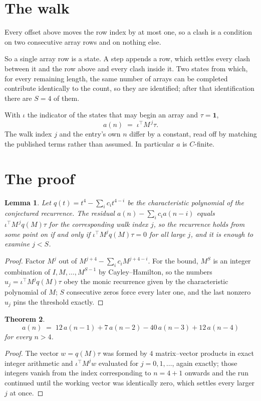 \documentclass[11pt,a4paper]{article}
\theoremstyle{plain}
\newtheorem{theorem}{Theorem}
\newtheorem{lemma}[theorem]{Lemma}
\theoremstyle{definition}
\begin{document}
\section{The walk}

Every offset above moves the row index by at most one, so a clash is a condition on two
consecutive array rows and on nothing else.

So a single array row is a state. A step appends a row, which settles every clash between it
and the row above and every clash inside it. Two states from which, for every remaining length,
the same number of arrays can be completed contribute identically to the count, so they are
identified; after that identification there are $S=4$ of them.

With $\iota$ the indicator of the states that may begin an array and $\tau=\mathbf{1}$,
\[
a(n)\;=\;\iota^{\!\top}M^{\,j}\tau .
\]
The walk index $j$ and the entry's own $n$ differ by a constant, read off by matching the
published terms rather than assumed. In particular $a$ is $C$-finite.

\section{The proof}

\begin{lemma}\label{lem:crit}
Let $q(t)=t^{4}-\sum_i c_it^{4-i}$ be the characteristic polynomial of the
conjectured recurrence. The residual $a(n)-\sum_ic_ia(n-i)$ equals
$\iota^{\!\top}M^{\,j}q(M)\tau$ for the corresponding walk index $j$, so the recurrence
holds from some point on if and only if $\iota^{\!\top}M^{j}q(M)\tau=0$ for all large $j$,
and it is enough to examine $j<S$.
\end{lemma}

\begin{proof}
Factor $M^{j}$ out of $M^{j+4}-\sum_ic_iM^{j+4-i}$. For the bound, $M^{S}$
is an integer combination of $I,M,\dots,M^{S-1}$ by Cayley--Hamilton, so the numbers
$u_j=\iota^{\!\top}M^{j}q(M)\tau$ obey the monic recurrence given by the characteristic
polynomial of $M$; $S$ consecutive zeros force every later one, and the last nonzero $u_j$
pins the threshold exactly.
\end{proof}

\begin{theorem}
\[
a(n)\;=\;12\,a(n-1) + 7\,a(n-2) - 40\,a(n-3) + 12\,a(n-4)
\]
for every $n>4$.
\end{theorem}

\begin{proof}
The vector $w=q(M)\tau$ was formed by $4$ matrix--vector products in exact integer
arithmetic and $\iota^{\!\top}M^{j}w$ evaluated for $j=0,1,\dots$, again exactly; those
integers vanish from the index corresponding to $n=4+1$ onwards and the run continued
until the working vector was identically zero, which settles every larger $j$ at once.
\end{proof}
\end{document}
